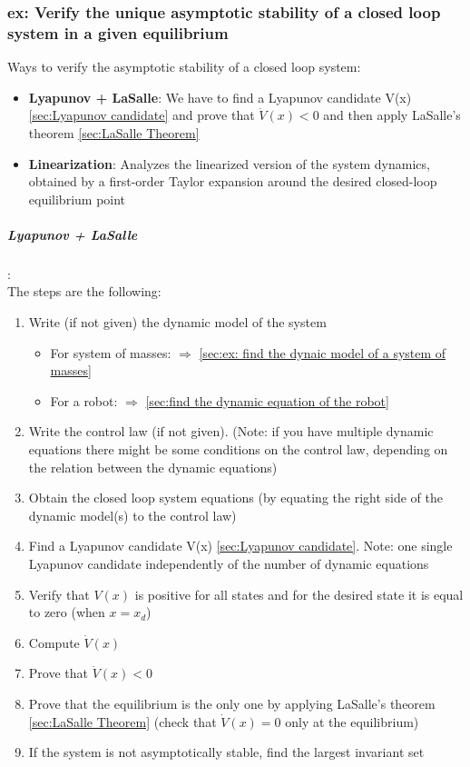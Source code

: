 \documentclass[a4paper,12pt]{article}
\begin{document}
\subsubsection{ex: Verify the unique asymptotic stability of a closed loop
system in a given equilibrium}
Ways to verify the asymptotic stability of a
closed loop system:
\begin{itemize}
    \item \textbf{Lyapunov + LaSalle}: We have to find a Lyapunov
    candidate V(x) \ref{sec:Lyapunov candidate} and prove that $\dot{V}(x) < 0$ and then apply
    LaSalle's theorem \ref{sec:LaSalle Theorem}
    \item \textbf{Linearization}: Analyzes the linearized version of the system
    dynamics, obtained by a first-order Taylor expansion around the desired closed-loop equilibrium
    point
\end{itemize}
\subparagraph{Lyapunov + LaSalle}:\\
\label{sub:Lyapunov + LaSalle}
The steps are the following:
\begin{enumerate}
    \item Write (if not given) the dynamic model of the system 
    \begin{itemize}
        \item For system of masses: $\Rightarrow$ \ref{sec:ex: find the dynaic model of a system of masses}
        \item For a robot: $\Rightarrow$ \ref{sec:find the dynamic equation of the robot}
    \end{itemize}
    \item Write the control law (if not given). (Note: if you have multiple
    dynamic equations there might be some conditions on the control law, depending
    on the relation between the dynamic equations)
    \item Obtain the closed loop system equations (by 
    equating the right side of the dynamic model(s) to the control law)
    \item Find a Lyapunov candidate V(x) \ref{sec:Lyapunov candidate}. 
    Note: one single Lyapunov candidate independently of 
    the number of dynamic equations
    \item Verify that $V(x)$ is positive for all states and for 
    the desired state it is equal to zero (when $x = x_d$)
    \item Compute $\dot{V}(x)$
    \item Prove that $\dot{V}(x) < 0$
    \item Prove that the equilibrium is the only one by applying
     LaSalle's theorem \ref{sec:LaSalle Theorem} (check that 
     $\dot{V}(x) = 0$ only at the equilibrium)
    \item If the system is not asymptotically stable, find the
    largest invariant set
\end{enumerate}
\end{document}
